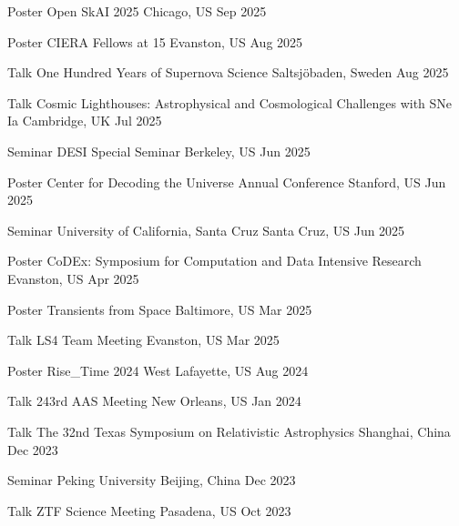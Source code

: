 


\begin{cventries}
	
	\cvsimsimpentry
	{Poster}
	{Open SkAI 2025}
	{Chicago, US}
	{Sep 2025}

	\cvsimsimpentry
	{Poster}
	{CIERA Fellows at 15}
	{Evanston, US}
	{Aug 2025}

	\cvsimsimpentry
	{Talk}
	{One Hundred Years of Supernova Science}
	{Saltsjöbaden, Sweden}
	{Aug 2025}

	\cvsimsimpentry
	{Talk}
	{Cosmic Lighthouses: Astrophysical and Cosmological Challenges with SNe Ia}
	{Cambridge, UK}
	{Jul 2025}

	\cvsimsimpentry
	{Seminar}
	{DESI Special Seminar}
	{Berkeley, US}
	{Jun 2025}

	\cvsimsimpentry
	{Poster}
	{Center for Decoding the Universe Annual Conference}
	{Stanford, US}
	{Jun 2025}

	\cvsimsimpentry
	{Seminar}
	{University of California, Santa Cruz}
	{Santa Cruz, US}
	{Jun 2025}

	\cvsimsimpentry
	{Poster}
	{CoDEx: Symposium for Computation and Data Intensive Research}
	{Evanston, US}
	{Apr 2025}

	\cvsimsimpentry
	{Poster}
	{Transients from Space}
	{Baltimore, US}
	{Mar 2025}

	\cvsimsimpentry
	{Talk}
	{LS4 Team Meeting}
	{Evanston, US}
	{Mar 2025}

	\cvsimsimpentry
	{Poster}
	{Rise\_Time 2024}
	{West Lafayette, US}
	{Aug 2024}

	\cvsimsimpentry
	{Talk}
	{243rd AAS Meeting}
	{New Orleans, US}
	{Jan 2024}

	\cvsimsimpentry
	{Talk}
	{The 32nd Texas Symposium on Relativistic Astrophysics}
	{Shanghai, China}
	{Dec 2023}

	\cvsimsimpentry
	{Seminar}
	{Peking University}
	{Beijing, China}
	{Dec 2023}

	\cvsimsimpentry
	{Talk}
	{ZTF Science Meeting}
	{Pasadena, US}
	{Oct 2023}
	

\end{cventries}
